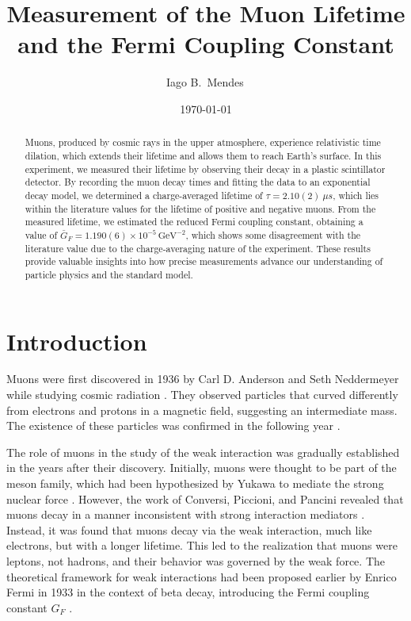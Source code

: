 \documentclass{../paper}
\begin{document}
\title{Measurement of the Muon Lifetime and the Fermi Coupling Constant}

\author{Iago B.~Mendes\,}

\date{\today}

\begin{abstract}
  Muons, produced by cosmic rays in the upper atmosphere, experience relativistic time dilation, which extends their lifetime and allows them to reach Earth's surface. In this experiment, we measured their lifetime by observing their decay in a plastic scintillator detector. By recording the muon decay times and fitting the data to an exponential decay model, we determined a charge-averaged lifetime of $\tau = 2.10(2) \ \mu s$, which lies within the literature values for the lifetime of positive and negative muons. From the measured lifetime, we estimated the reduced Fermi coupling constant, obtaining a value of $\bar G_F = 1.190(6) \times 10^{-5} \, \text{GeV}^{-2}$, which shows some disagreement with the literature value due to the charge-averaging nature of the experiment. These results provide valuable insights into how precise measurements advance our understanding of particle physics and the standard model.
\end{abstract}

\maketitle

\section{Introduction}

Muons were first discovered in 1936 by Carl D. Anderson and Seth Neddermeyer while studying cosmic radiation \cite{Anderson1936}. They observed particles that curved differently from electrons and protons in a magnetic field, suggesting an intermediate mass. The existence of these particles was confirmed in the following year \cite{Street1937}.

The role of muons in the study of the weak interaction was gradually established in the years after their discovery. Initially, muons were thought to be part of the meson family, which had been hypothesized by Yukawa to mediate the strong nuclear force \cite{Yukawa1935}. However, the work of Conversi, Piccioni, and Pancini revealed that muons decay in a manner inconsistent with strong interaction mediators \cite{Conversi1946}. Instead, it was found that muons decay via the weak interaction, much like electrons, but with a longer lifetime. This led to the realization that muons were leptons, not hadrons, and their behavior was governed by the weak force. The theoretical framework for weak interactions had been proposed earlier by Enrico Fermi in 1933 in the context of beta decay, introducing the Fermi coupling constant $G_F$ \cite{Fermi1933}.
\end{document}
